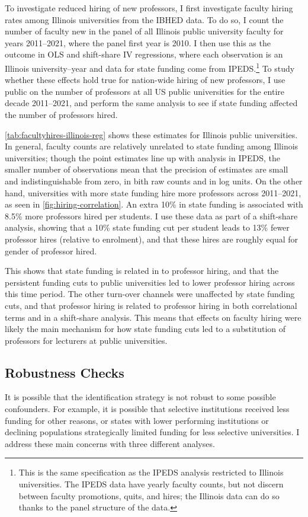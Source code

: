 To investigate reduced hiring of new professors, I first investigate faculty hiring rates among Illinois universities from the IBHED data.
To do so, I count the number of faculty new in the panel of all Illinois public university faculty for years 2011--2021, where the panel first year is 2010.
I then use this as the outcome in OLS and shift-share IV regressions, where each observation is an Illinois university--year and data for state funding come from IPEDS.\footnote{
    This is the same specification as the IPEDS analysis restricted to Illinois universities.
    The IPEDS data have yearly faculty counts, but not discern between faculty promotions, quits, and hires; the Illinois data can do so thanks to the panel structure of the data.
}
To study whether these effects hold true for nation-wide hiring of new professors, I use public on the number of professors at all US public universities for the entire decade 2011--2021, and perform the same analysis to see if state funding affected the number of professors hired.

\autoref{tab:facultyhires-illinois-reg} shows these estimates for Illinois public universities.
In general, faculty counts are relatively unrelated to state funding among Illinois universities; though the point estimates line up with analysis in IPEDS, the smaller number of observations mean that the precision of estimates are small and indistinguishable from zero, in bith raw counts and in log units.
On the other hand, universities with more state funding hire more professors across 2011--2021, as seen in \autoref{fig:hiring-correlation}.
An extra 10\% in state funding is associated with 8.5\% more professors hired per students.
I use these data as part of a shift-share analysis, showing that a 10\% state funding cut per student leads to 13\% fewer professor hires (relative to enrolment), and that these hires are roughly equal for gender of professor hired.

This shows that state funding is related in to professor hiring, and that the persistent funding cuts to public universities led to lower professor hiring across this time period.
The other turn-over channels were unaffected by state funding cuts, and that professor hiring is related to professor hiring in both correlational terms and in a shift-share analysis.
This means that effects on faculty hiring were likely the main mechanism for how state funding cuts led to a substitution of professors for lecturers at public universities.

\subsection{Robustness Checks}
\label{sec:results-robustness}
It is possible that the identification strategy is not robust to some possible confounders.
For example, it is possible that selective institutions received less funding for other reasons, or states with lower performing institutions or declining populations strategically limited funding for less selective universities.
I address these main concerns with three different analyses.

